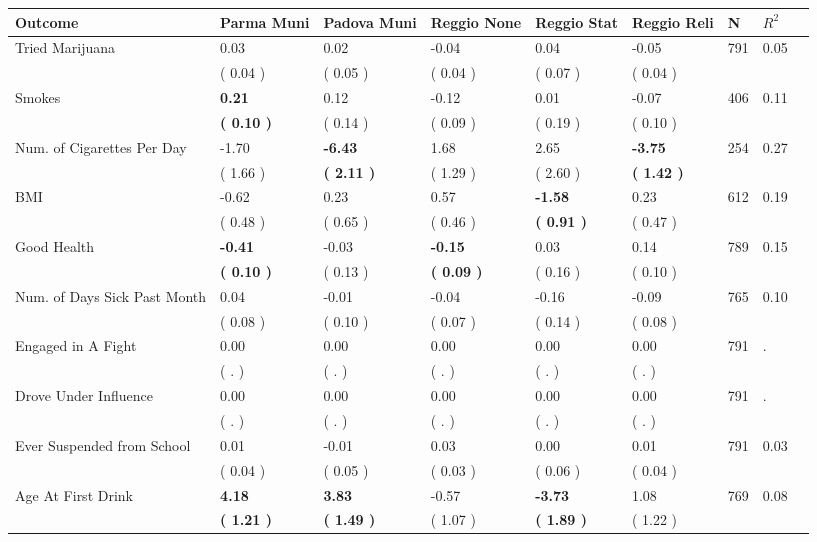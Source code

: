 \begin{tabular}{L{6.2cm} C{1.8cm} C{1.8cm} C{1.8cm} C{1.8cm} C{1.8cm} C{1.8cm} C{0.3cm} C{0.3cm}}
\toprule
 \textbf{Outcome} & \textbf{Parma Muni} & \textbf{Padova Muni} & \textbf{Reggio None} & \textbf{Reggio Stat} & \textbf{Reggio Reli} & \textbf{N} & \textbf{$ R^2$} \\
\midrule
Tried Marijuana &      0.03 &      0.02 &     -0.04 &      0.04 &     -0.05  & 791 &       0.05 \\ 
 & (     0.04 ) & (     0.05 ) & (     0.04 ) & (     0.07 ) & (     0.04 )  & \\
Smokes & \textbf{     0.21} &      0.12 &     -0.12 &      0.01 &     -0.07  & 406 &       0.11 \\ 
 & \textbf{(     0.10 )} & (     0.14 ) & (     0.09 ) & (     0.19 ) & (     0.10 )  & \\
Num. of Cigarettes Per Day &     -1.70 & \textbf{    -6.43} &      1.68 &      2.65 & \textbf{    -3.75}  & 254 &       0.27 \\ 
 & (     1.66 ) & \textbf{(     2.11 )} & (     1.29 ) & (     2.60 ) & \textbf{(     1.42 )}  & \\
BMI &     -0.62 &      0.23 &      0.57 & \textbf{    -1.58} &      0.23  & 612 &       0.19 \\ 
 & (     0.48 ) & (     0.65 ) & (     0.46 ) & \textbf{(     0.91 )} & (     0.47 )  & \\
Good Health & \textbf{    -0.41} &     -0.03 & \textbf{    -0.15} &      0.03 &      0.14  & 789 &       0.15 \\ 
 & \textbf{(     0.10 )} & (     0.13 ) & \textbf{(     0.09 )} & (     0.16 ) & (     0.10 )  & \\
Num. of Days Sick Past Month &      0.04 &     -0.01 &     -0.04 &     -0.16 &     -0.09  & 765 &       0.10 \\ 
 & (     0.08 ) & (     0.10 ) & (     0.07 ) & (     0.14 ) & (     0.08 )  & \\
Engaged in A Fight &      0.00 &      0.00 &      0.00 &      0.00 &      0.00  & 791 &          . \\ 
 & (        . ) & (        . ) & (        . ) & (        . ) & (        . )  & \\
Drove Under Influence &      0.00 &      0.00 &      0.00 &      0.00 &      0.00  & 791 &          . \\ 
 & (        . ) & (        . ) & (        . ) & (        . ) & (        . )  & \\
Ever Suspended from School &      0.01 &     -0.01 &      0.03 &      0.00 &      0.01  & 791 &       0.03 \\ 
 & (     0.04 ) & (     0.05 ) & (     0.03 ) & (     0.06 ) & (     0.04 )  & \\
Age At First Drink & \textbf{     4.18} & \textbf{     3.83} &     -0.57 & \textbf{    -3.73} &      1.08  & 769 &       0.08 \\ 
 & \textbf{(     1.21 )} & \textbf{(     1.49 )} & (     1.07 ) & \textbf{(     1.89 )} & (     1.22 )  & \\
\bottomrule
\end{tabular}
